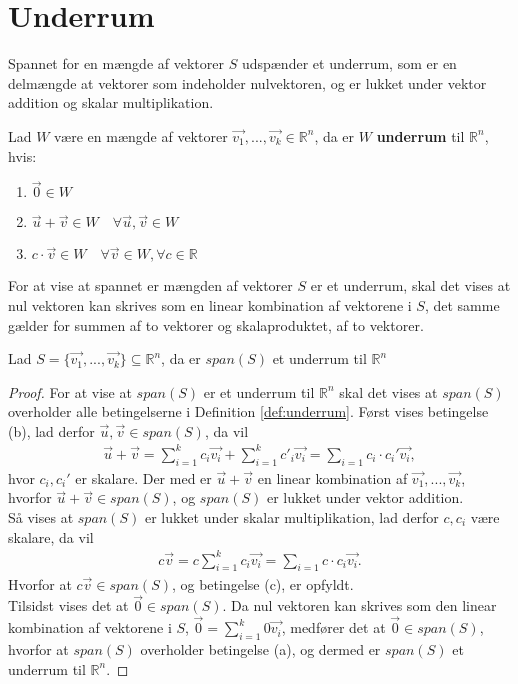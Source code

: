 \section{Underrum}
Spannet for en mængde af vektorer $S$ udspænder et underrum, som er en delmængde at vektorer som indeholder nulvektoren, og er lukket under vektor addition og skalar multiplikation.
\begin{defn}[Underrum]
Lad $W$ være en mængde af vektorer $\vec{v_1},...,\vec{v_k} \in \mathds{R}^n$, da er $W$  \textbf{underrum} til $\mathds{R}^n$, hvis:
\begin{enumerate}[label=\alph*]
\item $\vec{0} \in W$
\item $\vec{u}+\vec{v} \in W \quad \forall \vec{u}, \vec{v} \in W$
\item $c \cdot \vec{v} \in W \quad \forall \vec{v} \in W, \forall c \in \mathds{R}$
\end{enumerate}
\label{def:underrum}
\end{defn}
For at vise at spannet er mængden af vektorer $S$ er et underrum, skal det vises at nul vektoren kan skrives som en linear kombination af vektorene i $S$, det samme gælder for summen af to vektorer og skalaproduktet, af to vektorer.
\begin{stn}
Lad $S=\{\vec{v_1},...,\vec{v_k}\} \subseteq \mathds{R}^n$, da er $span(S)$ et underrum til $\mathds{R}^n$
\label{stn:spanunderrum}
\end{stn}
\begin{proof}
For at vise at $span(S)$ er et underrum til $\mathds{R}^n$ skal det vises at $span(S)$ overholder alle betingelserne i Definition \ref{def:underrum}.
Først vises betingelse (b), lad  derfor $\vec{u}, \vec{v} \in span(S)$, da vil 
\begin{align*}
\vec{u}+\vec{v}= \sum_{i=1}^k c_i \vec{v_i} + \sum_{i=1}^k c'_i \vec{v_i} = \sum_{i=1} c_i\cdot c_i' \vec{v_i},
\end{align*}
hvor $c_i, c_i'$ er skalare.
Der med er $\vec{u}+\vec{v}$ en linear kombination af $\vec{v_1},...,\vec{v_k}$, hvorfor $\vec{u}+\vec{v} \in span(S)$, og $span(S)$ er lukket under vektor addition.
\\ Så vises at $span(S)$ er lukket under skalar multiplikation, lad derfor $c, c_i$ være skalare, da vil
\begin{align*}
c\vec{v}= c\sum_{i=1}^k c_i \vec{v_i}  = \sum_{i=1} c \cdot c_i \vec{v_i}.
\end{align*}
Hvorfor at $c\vec{v} \in span(S)$, og betingelse (c), er opfyldt.
\\Tilsidst vises det at $\vec{0} \in span(S)$.
Da nul vektoren kan skrives som den linear kombination af vektorene i $S$, $\vec{0} = \sum_{i=1}^k 0 \vec{v_i}$, medfører det at $\vec{0} \in span(S)$, hvorfor at $span(S)$ overholder betingelse (a), og dermed er $span(S)$ et underrum til $\mathds{R}^n$.
\end{proof}
